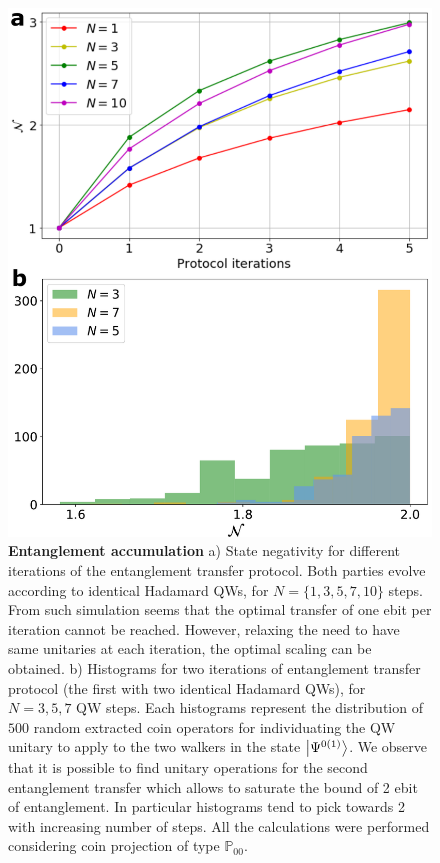 \documentclass[
	aps, pra,
	superscriptaddress, twocolumn,
	floatfix,
	10pt
]{revtex4-1}
\newcommand{\PP}{\mathbb{P}}
\begin{document}
\begin{figure}[tb]
	\centering
    \includegraphics[width = \columnwidth]{figures/entanglement_accumulation_results.pdf}
    \caption{\textbf{Entanglement accumulation}
    a) State negativity for different iterations of the entanglement transfer protocol. Both parties evolve according to identical Hadamard QWs, for $N=\{1,3,5,7,10\}$ steps. From such simulation seems that the optimal transfer of one ebit per iteration cannot be reached. However, relaxing the need to have same unitaries at each iteration, the optimal scaling can be obtained. b) Histograms for two iterations of entanglement transfer protocol (the first with two identical Hadamard QWs), for $N=3,5, 7$ QW steps. 
    Each histograms represent the distribution of $500$ random extracted coin operators for individuating the QW unitary to apply to the two walkers in the state $\ket{\Psi^{0(1)}}$. We observe that it is possible to find unitary operations for the second entanglement transfer which allows to saturate the bound of 2 ebit of entanglement. In particular histograms tend to pick towards 2 with increasing number of steps. All the calculations were performed considering coin projection of type $\PP_{00}$.
    }
    \label{fig:entanglement_accumulation_numerical_results}
\end{figure}
\end{document}
